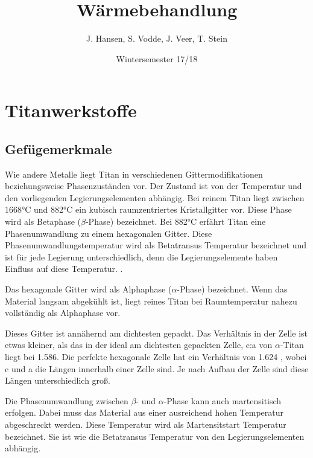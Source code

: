 \documentclass[a4paper, 11pt]{tubsreprt}
\title{Wärmebehandlung}
\date{Wintersemester 17/18}
\author{J. Hansen, S. Vodde,
 J. Veer, T. Stein}
\begin{document}
\maketitle
\tableofcontents
\chapter{Titanwerkstoffe}

\section{Gefügemerkmale}
Wie andere Metalle liegt Titan in verschiedenen Gittermodifikationen beziehungsweise Phasenzuständen vor. Der Zustand ist von der Temperatur und den vorliegenden Legierungselementen abhängig. Bei reinem Titan liegt zwischen 1668°C und 882°C ein kubisch raumzentriertes Kristallgitter vor. Diese Phase wird als Betaphase ($\beta$-Phase) bezeichnet. Bei 882°C erfährt Titan eine Phasenumwandlung zu einem hexagonalen Gitter. Diese Phasenumwandlungstemperatur wird als Betatransus Temperatur bezeichnet und ist für jede Legierung unterschiedlich, denn die Legierungselemente haben Einfluss auf diese Temperatur. \cite{Luetjering2007}.

Das hexagonale Gitter wird als Alphaphase ($\alpha$-Phase) bezeichnet. Wenn das Material langsam abgekühlt ist, liegt reines Titan bei Raumtemperatur nahezu vollständig als Alphaphase vor. 

Dieses Gitter ist annähernd am dichtesten gepackt. Das Verhältnis in der Zelle ist etwas kleiner, als das in der ideal am dichtesten gepackten Zelle, c:a von $\alpha$-Titan liegt bei 1.586. Die perfekte hexagonale Zelle hat ein Verhältnis von 1.624 \cite{Siemers2017}, wobei c und a die Längen innerhalb einer Zelle sind. Je nach Aufbau der Zelle sind diese Längen unterschiedlich groß.

Die Phasenumwandlung zwischen $\beta$- und $\alpha$-Phase kann auch martensitisch erfolgen. Dabei muss das Material aus einer ausreichend hohen Temperatur abgeschreckt werden. Diese Temperatur wird als Martensitstart Temperatur bezeichnet. Sie ist wie die Betatransus Temperatur von den Legierungselementen abhängig.  
\end{document}
